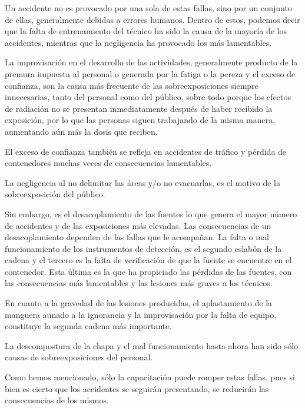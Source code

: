 Un accidente no es provocado por una sola de estas fallas, sino por un conjunto de ellas, generalmente debidas a errores humanos. Dentro de estos, podemos decir que la falta de entrenamiento del técnico ha sido la causa de la mayoría de los accidentes, mientras que la negligencia ha provocado los más lamentables.

La improvisación en el desarrollo de las actividades, generalmente producto de la premura impuesta al personal o generada por la fatiga o la pereza y el exceso de confianza, son la causa más frecuente de las sobreexposiciones siempre innecesarias, tanto del personal como del público, sobre todo porque los efectos de radiación no se presentan inmediatamente después de haber recibido la exposición, por lo que las personas siguen trabajando de la misma manera, aumentando aún más la dosis que reciben.

El exceso de confianza también se refleja en accidentes de tráfico y pérdida de contenedores muchas veces de consecuencias lamentables.

La negligencia al no delimitar las áreas y/o no evacuarlas, es el motivo de la sobreexposición del público.

Sin embargo, es el desacoplamiento de las fuentes lo que genera el mayor número de accidentes y de las exposiciones más elevadas. Las consecuencias de un desacoplamiento dependen de las fallas que le acompañan. La falta o mal funcionamiento de los instrumentos de detección, es el segundo eslabón de la cadena y el tercero es la falta de verificación de que la fuente se encuentre en el contenedor. Esta última es la que ha propiciado las pérdidas de las fuentes, con las consecuencias más lamentables y las lesiones más graves a los técnicos.

En cuanto a la gravedad de las lesiones producidas, el aplastamiento de la manguera aunado a la ignorancia y la improvisación por la falta de equipo, constituye la segunda cadena más importante.

La descompostura de la chapa y el mal funcionamiento hasta ahora han sido sólo causas de sobreexposiciones del personal.

Como hemos mencionado, sólo la capacitación puede romper estas fallas, pues si bien es cierto que los accidentes se seguirán presentando, se reducirán las consecuencias de los mismos.

